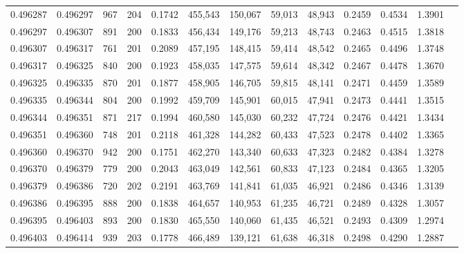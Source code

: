 \begin{tabular}{rrrrrrrrrrrrr}
0.496287 & 0.496297 &   967 & 204 &                                     0.1742 & 455,543 & 150,067 &  59,013 &  48,943 & 0.2459 & 0.4534 & 1.3901 \\
0.496297 & 0.496307 &   891 & 200 &                                     0.1833 & 456,434 & 149,176 &  59,213 &  48,743 & 0.2463 & 0.4515 & 1.3818 \\
0.496307 & 0.496317 &   761 & 201 &                                     0.2089 & 457,195 & 148,415 &  59,414 &  48,542 & 0.2465 & 0.4496 & 1.3748 \\
0.496317 & 0.496325 &   840 & 200 &                                     0.1923 & 458,035 & 147,575 &  59,614 &  48,342 & 0.2467 & 0.4478 & 1.3670 \\
0.496325 & 0.496335 &   870 & 201 &                                     0.1877 & 458,905 & 146,705 &  59,815 &  48,141 & 0.2471 & 0.4459 & 1.3589 \\
0.496335 & 0.496344 &   804 & 200 &                                     0.1992 & 459,709 & 145,901 &  60,015 &  47,941 & 0.2473 & 0.4441 & 1.3515 \\
0.496344 & 0.496351 &   871 & 217 &                                     0.1994 & 460,580 & 145,030 &  60,232 &  47,724 & 0.2476 & 0.4421 & 1.3434 \\
0.496351 & 0.496360 &   748 & 201 &                                     0.2118 & 461,328 & 144,282 &  60,433 &  47,523 & 0.2478 & 0.4402 & 1.3365 \\
0.496360 & 0.496370 &   942 & 200 &                                     0.1751 & 462,270 & 143,340 &  60,633 &  47,323 & 0.2482 & 0.4384 & 1.3278 \\
0.496370 & 0.496379 &   779 & 200 &                                     0.2043 & 463,049 & 142,561 &  60,833 &  47,123 & 0.2484 & 0.4365 & 1.3205 \\
0.496379 & 0.496386 &   720 & 202 &                                     0.2191 & 463,769 & 141,841 &  61,035 &  46,921 & 0.2486 & 0.4346 & 1.3139 \\
0.496386 & 0.496395 &   888 & 200 &                                     0.1838 & 464,657 & 140,953 &  61,235 &  46,721 & 0.2489 & 0.4328 & 1.3057 \\
0.496395 & 0.496403 &   893 & 200 &                                     0.1830 & 465,550 & 140,060 &  61,435 &  46,521 & 0.2493 & 0.4309 & 1.2974 \\
0.496403 & 0.496414 &   939 & 203 &                                     0.1778 & 466,489 & 139,121 &  61,638 &  46,318 & 0.2498 & 0.4290 & 1.2887 \\

\end{tabular}

